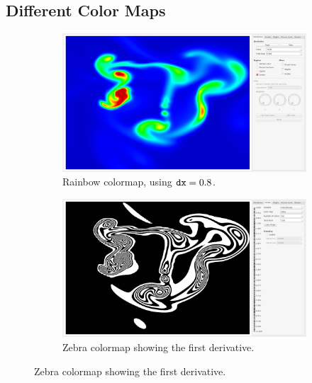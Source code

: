 

\subsection{Different Color Maps}

	\begin{figure}
	\centering
	\begin{subfigure}{0.44\textwidth}
		\centering
		\includegraphics[width=\textwidth, trim={35px 30px 430px 30px}, clip]{colormapping/img/rainbow}
		\caption{Rainbow colormap, using $\mathtt{dx} = 0.8$.}
		\label{fig:colormapping:intro:differntColorMaps:rainbow}
	\end{subfigure}
	\begin{subfigure}{0.44\textwidth}
		\centering
		\includegraphics[width=\textwidth, trim={35px 30px 430px 30px}, clip]{colormapping/img/zebra_166}
		\caption{Zebra colormap showing the first derivative.}
		\label{fig:colormapping:intro:differntColorMaps:zebra}

\end{subfigure}
\end{figure}
